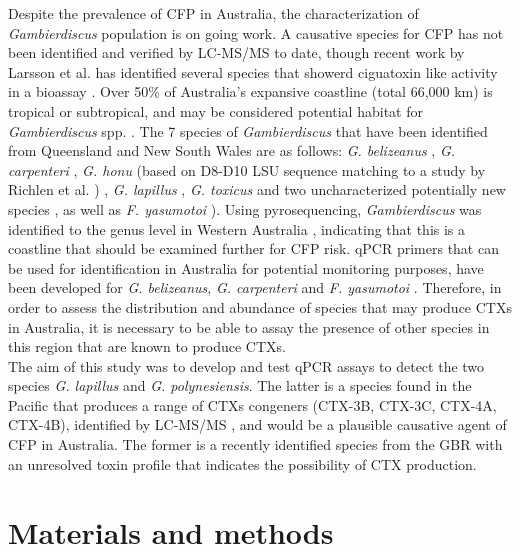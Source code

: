 \documentclass[12pt]{article}
\begin{document}
Despite the prevalence of CFP in Australia, the characterization of \textit{Gambierdiscus} population is on going work. A causative species for CFP has not been identified and verified by LC-MS/MS to date, though recent work by Larsson et al. has identified several species that showerd ciguatoxin like activity in a bioassay \cite{larsson2018toxicology}.
Over 50\% of Australia's expansive coastline (total 66,000 km) is tropical or subtropical, and may be considered potential habitat for \emph{Gambierdiscus} spp. \citep{kretzschmar2016characterization}. 
The 7 species of \emph{Gambierdiscus} that have been identified from Queensland and New South Wales are as follows: \emph{G. belizeanus} \citep{murray2014molecular}, \emph{G. carpenteri} \citep{kohli2014high,sparrow2017effects}, \emph{G. honu} (based on D8-D10 LSU sequence matching to a study by Richlen et al. \cite{richlen2008phylogeography}) \citep{rhodes2017new}, \emph{G. lapillus} \citep{kretzschmar2016characterization}, \emph{G. toxicus} \citep{hallegraeff2010algae} and two uncharacterized potentially new species \cite{larsson2018toxicology}, as well as \emph{F. yasumotoi}  \citep{murray2014molecular}). 
Using pyrosequencing, \textit{Gambierdiscus} was identified to the genus level in Western Australia \citep{kohli2014cob}, indicating that this is a coastline that should be examined further for CFP risk. 
qPCR primers that can be used for identification in Australia for potential monitoring purposes, have been developed for \emph{G. belizeanus}, \emph{G. carpenteri} and \emph{F. yasumotoi} \citep{nishimura2016quantitative,vandersea2012development}. Therefore, in order to assess the distribution and abundance of species that may produce CTXs in Australia, it is necessary to be able to assay the presence of other species in this region that are known to produce CTXs.\\ 


The aim of this study was to develop and test qPCR assays to detect the two species \emph{G. lapillus} and \emph{G. polynesiensis}. The latter is a species found in the Pacific that produces a range of CTXs congeners (CTX-3B, CTX-3C, CTX-4A, CTX-4B), identified by LC-MS/MS \citep{rhodes2014production}, and would be a plausible causative agent of CFP in Australia. The former is a recently identified species from the GBR with an unresolved toxin profile that indicates the possibility of CTX production.
\newpage
\section*{Materials and methods}
\end{document}
